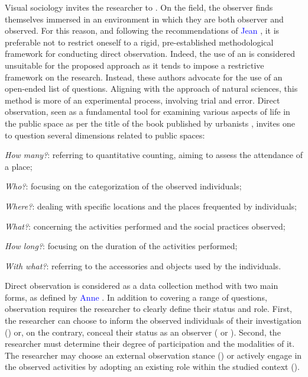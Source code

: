 \begin{refsegment}
Visual sociology invites the researcher to  \textcolor{blue}{\autocite[14]{maresca_photographie_1996}}. On the field, the observer finds themselves immersed in an environment in which they are both observer and observed. For this reason, and following the recommendations of \textcolor{blue}{Jean} \textcolor{blue}{\textcite[126]{peneff_mesure_1995}}, it is preferable not to restrict oneself to a rigid, pre-established methodological framework for conducting direct observation. Indeed, the use of an  is considered unsuitable for the proposed approach as it tends to impose a restrictive framework on the research. Instead, these authors advocate for the use of an open-ended list of questions. Aligning with the approach of natural sciences, this method is more of an experimental process, involving trial and error. Direct observation, seen as a fundamental tool for examining various aspects of life in the \gls{public space} as per the title of the book published by urbanists \textcolor{blue}{\textcite[19]{gehl_vie_2019}}, invites one to question several dimensions related to public spaces:
    \begin{customitemize}
\item \textsl{How many?}: referring to quantitative counting, aiming to assess the attendance of a place;
\item \textsl{Who?}: focusing on the categorization of the observed individuals;
\item \textsl{Where?}: dealing with specific locations and the places frequented by individuals;
\item \textsl{What?}: concerning the activities performed and the social practices observed;
\item \textsl{How long?}: focusing on the duration of the activities performed;
\item \textsl{With what?}: referring to the accessories and objects used by the individuals.
    \end{customitemize}%

Direct observation is considered as a data collection method with two main forms, as defined by \textcolor{blue}{Anne} \textcolor{blue}{\textcite[17, 21]{revillard_observation_2018}}. In addition to covering a range of questions, observation requires the researcher to clearly define their status and role. First, the researcher can choose to inform the observed individuals of their investigation () or, on the contrary, conceal their status as an observer (  or ). Second, the researcher must determine their degree of participation and the modalities of it. The researcher may choose an external observation stance () or actively engage in the observed activities by adopting an existing role within the studied context ().%


\end{refsegment}

